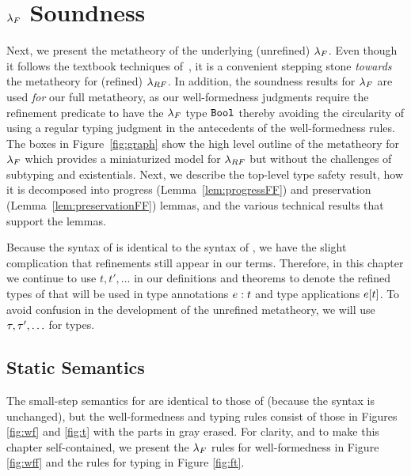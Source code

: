 \chapter{$\lambda_{F}$ Soundness}
\label{ch:systemF}

Next, we present the metatheory  
of the underlying (unrefined) 
$\lambda_{F}$. Even though it follows the textbook techniques of~\citet{TAPL},
it is a convenient 
stepping stone \emph{towards} 
the metatheory for (refined) $\lambda_{RF}$.
%
In addition, the soundness results 
for $\lambda_{F}$ are used \emph{for}                       %
our full metatheory, as our well-formedness           %
judgments require the refinement                      %
predicate to have the $\lambda_{F}$ type 
$\texttt{Bool}$ thereby avoiding the circularity 
of using a regular typing judgment in the 
antecedents of the well-formedness rules. 
%
%
The \colboth boxes in Figure~\ref{fig:graph}
show the high level outline of the metatheory 
for $\lambda_{F}$ which provides a miniaturized model
for $\lambda_{RF}$ but without the challenges 
of subtyping
and existentials. Next, we describe the top-level 
type safety result, how it is decomposed into 
progress (Lemma~\ref{lem:progressFF}) and 
preservation (Lemma~\ref{lem:preservationFF}) 
lemmas, and the various technical results that 
support the lemmas.

Because the syntax of \sysf is identical to the
syntax of \sysrf, we have the slight complication
that refinements still appear in our terms.
%
Therefore, in this chapter we continue to use $t, t', \ldots$ 
in our definitions and theorems to denote the 
refined types of \sysrf that will be used
in type annotations $e : t$
and type applications $e[t]$. 
%
To avoid confusion in the development of the
unrefined metatheory, we will
use $\tau, \tau',\ldots$ for 
\sysf types. 

\section{Static Semantics}
\label{sec:staticF}

The small-step semantics for \sysf are identical to
those of \sysrf (because the syntax is unchanged),
but the well-formedness and typing rules consist 
of those in Figures \ref{fig:wf} and \ref{fig:t}
with the parts in gray erased.
%
For clarity, 
and to make this chapter self-contained,
we present the $\lambda_{F}$ rules for
well-formedness in Figure \ref{fig:wff} and the 
rules for typing in Figure \ref{fig:ft}.

